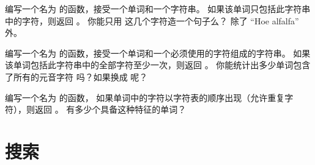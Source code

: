 \begin{exercise}


编写一个名为  的函数，接受一个单词和一个字符串。
如果该单词只包括此字符串中的字符，则返回 。
你能只用  这几个字符造一个句子么？ 除了 ``Hoe alfalfa'' 外。

\end{exercise}


\begin{exercise}


编写一个名为  的函数，接受一个单词和一个必须使用的字符组成的字符串。
如果该单词包括此字符串中的全部字符至少一次，则返回 。
你能统计出多少单词包含了所有的元音字符 吗？如果换成  呢？

\end{exercise}


\begin{exercise}


编写一个名为  的函数， 如果单词中的字符以字符表的顺序出现（允许重复字符），则返回  。
有多少个具备这种特征的单词？


\end{exercise}



\section{搜索}
\label{search}
  

